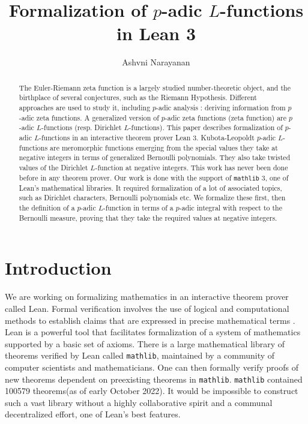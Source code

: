 \documentclass[a4paper,UKenglish,cleveref, autoref, thm-restate]{lipics-v2021}
\title{Formalization of $p$-adic $L$-functions in Lean 3} %
\author{Ashvni Narayanan}{London School of Geometry and Number Theory, Imperial College London}{a.narayanan20@imperial.ac.uk}{https://orcid.org/0000-0003-2777-4228}{EPSRC Grant EP/S021590/1 (UK)}%
\newcommand{\lean}[1]{\texttt{#1}\xspace} %
\begin{document}
\maketitle

\begin{abstract}
The Euler-Riemann zeta function is a largely studied number-theoretic object, and the birthplace of several conjectures, 
such as the Riemann Hypothesis. Different approaches are used to study it, including $p$-adic analysis : 
deriving information from $p$-adic zeta functions. A generalized version of $p$-adic zeta functions (zeta function) 
are $p$-adic $L$-functions (resp. Dirichlet $L$-functions). This paper describes formalization of $p$-adic $L$-functions 
in an interactive theorem prover Lean 3. Kubota-Leopoldt $p$-adic $L$-functions are meromorphic functions emerging from the 
special values they take at negative integers in terms of generalized Bernoulli polynomials. They also take twisted values of 
the Dirichlet $L$-function at negative integers. This work has never been done before in any theorem prover. 
Our work is done with the support of \lean{mathlib} 3, one of Lean's mathematical libraries. It required formalization of a 
lot of associated topics, such as Dirichlet characters, Bernoulli polynomials etc. We formalize these first, 
then the definition of a $p$-adic $L$-function in terms of a $p$-adic integral with respect to the Bernoulli measure, 
proving that they take the required values at negative integers.
\end{abstract}

\section{Introduction}
We are working on formalizing mathematics in an interactive theorem prover called Lean. 
Formal verification involves the use of logical and computational methods to establish 
claims that are expressed in precise mathematical terms \cite{TPIL}. Lean is a powerful tool 
that facilitates formalization of a system of mathematics supported by a basic set of axioms. There is a large mathematical library of theorems verified by Lean called \lean{mathlib}, maintained by a community of computer scientists and mathematicians. One can then 
formally verify proofs of new theorems dependent on preexisting theorems in \lean{mathlib}. 
\lean{mathlib} contained 100579 theorems(as of early October 2022). It would be impossible to construct 
such a vast library without a highly collaborative spirit and a communal decentralized effort, one of 
Lean's best features. 
\end{document}
